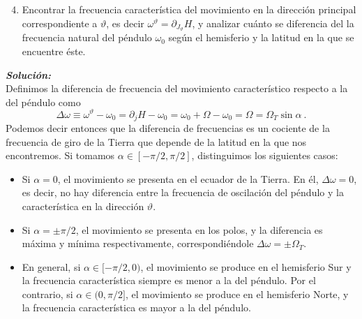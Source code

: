 \documentclass{article}
\begin{document}
\begin{mybox}
    \begin{enumerate}
    \setcounter{enumi}{3}
        \item Encontrar la frecuencia característica del movimiento en la dirección principal correspondiente a $\vartheta$, es decir $\omega^\vartheta = \partial_{J_\vartheta} H$, y analizar cuánto se diferencia del la frecuencia natural del péndulo $\omega_0$ según el hemisferio y la latitud en la que se encuentre éste.
    \end{enumerate}
\end{mybox}
\emph{\bfseries Solución:} \\

Definimos la diferencia de frecuencia del movimiento característico respecto a la del péndulo como $$\Delta \omega \equiv \omega ^\vartheta - \omega_0  = \partial_j H - \omega_0 =\omega_0 + \Omega -\omega_0 = \Omega = \Omega_T \sin \alpha \ .$$
Podemos decir entonces que la diferencia de frecuencias es un cociente de la frecuencia de giro de la Tierra que depende de la latitud en la que nos encontremos. Si tomamos $\alpha \in [-\pi/2,\pi/2]$, distinguimos los siguientes casos:
\begin{itemize}
    \item Si $\alpha = 0$, el movimiento se presenta en el ecuador de la Tierra. En él, $\Delta \omega = 0$, es decir, no hay diferencia entre la frecuencia de oscilación del péndulo y la característica en la dirección $\vartheta$.
    \item Si $\alpha = \pm \pi/2$, el movimiento se presenta en los polos, y la diferencia es máxima y mínima respectivamente, correspondiéndole $\Delta \omega = \pm \Omega_T$.
    \item En general, si $\alpha \in [-\pi/2,0)$, el movimiento se produce en el hemisferio Sur y la frecuencia característica siempre es menor a la del péndulo. Por el contrario, si $\alpha \in (0,\pi/2]$, el movimiento se produce en el hemisferio Norte, y la frecuencia característica es mayor a la del péndulo.  
\end{itemize}
\end{document}
